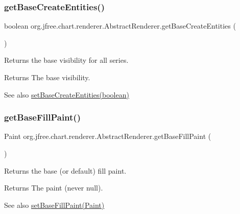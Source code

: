 \subsubsection{\texorpdfstring{get\+Base\+Create\+Entities()}{getBaseCreateEntities()}}
{\footnotesize\ttfamily boolean org.\+jfree.\+chart.\+renderer.\+Abstract\+Renderer.\+get\+Base\+Create\+Entities (\begin{DoxyParamCaption}{ }\end{DoxyParamCaption})}

Returns the base visibility for all series.

\begin{DoxyReturn}{Returns}
The base visibility.
\end{DoxyReturn}
\begin{DoxySeeAlso}{See also}
\mbox{\hyperlink{classorg_1_1jfree_1_1chart_1_1renderer_1_1_abstract_renderer_a7f6e0858465a3692ee7e9fd580ca0c3a}{set\+Base\+Create\+Entities(boolean)}} 
\end{DoxySeeAlso}
\mbox{\label{classorg_1_1jfree_1_1chart_1_1renderer_1_1_abstract_renderer_a2a4e95f2a4c788c700bf5f14eff1ad01}} 
\subsubsection{\texorpdfstring{get\+Base\+Fill\+Paint()}{getBaseFillPaint()}}
{\footnotesize\ttfamily Paint org.\+jfree.\+chart.\+renderer.\+Abstract\+Renderer.\+get\+Base\+Fill\+Paint (\begin{DoxyParamCaption}{ }\end{DoxyParamCaption})}

Returns the base (or default) fill paint.

\begin{DoxyReturn}{Returns}
The paint (never {\ttfamily null}).
\end{DoxyReturn}
\begin{DoxySeeAlso}{See also}
\mbox{\hyperlink{classorg_1_1jfree_1_1chart_1_1renderer_1_1_abstract_renderer_adc85155c19775ca3f04043f15e060811}{set\+Base\+Fill\+Paint(\+Paint)}} 
\end{DoxySeeAlso}
\mbox{\label{classorg_1_1jfree_1_1chart_1_1renderer_1_1_abstract_renderer_aa6277326bc1ddd480515de060803b682}} 
